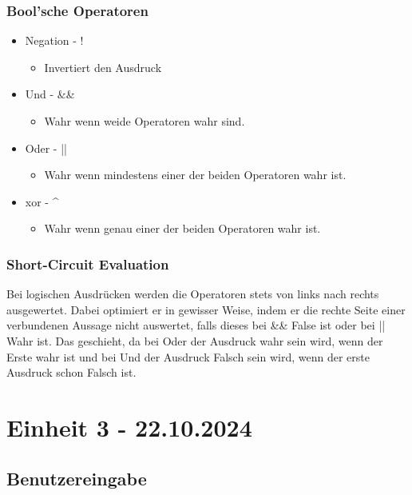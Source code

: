 \documentclass{article}
\begin{document}
	\subsubsection{Bool'sche Operatoren}
	\begin{itemize}
		\item{Negation - !}
		\begin{itemize}
			\item{Invertiert den Ausdruck}
		\end{itemize}
		\item{Und - \&\&}
		\begin{itemize}
			\item{Wahr wenn weide Operatoren wahr sind.}
		\end{itemize}
		\item{Oder - ||}
		\begin{itemize}
			\item{Wahr wenn mindestens einer der beiden Operatoren wahr ist.}
		\end{itemize}
		\item{xor - \^{}}
		\begin{itemize}
			\item{Wahr wenn genau einer der beiden Operatoren wahr ist.}
		\end{itemize}
	\end{itemize}
	\subsubsection{Short-Circuit Evaluation}
	Bei logischen Ausdrücken werden die Operatoren stets von links nach rechts ausgewertet. Dabei optimiert er in gewisser Weise, indem er die rechte Seite einer verbundenen Aussage nicht auswertet, falls dieses bei \&\& False ist oder bei || Wahr ist. Das geschieht, da bei Oder der Ausdruck wahr sein wird, wenn der Erste wahr ist und bei Und der Ausdruck Falsch sein wird, wenn der erste Ausdruck schon Falsch ist.
	\section{Einheit 3 - 22.10.2024}
	\subsection{Benutzereingabe}
\end{document}
